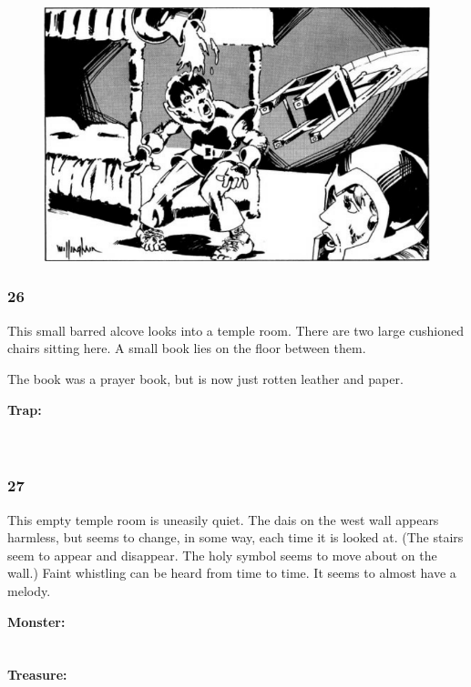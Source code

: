 \documentclass[palace_of_the_silver_princess]{subfiles}
\begin{document}
\begin{figure}[!ht]
    \includegraphics[width=\textwidth]{img/ghost.png}
\end{figure}

\subsubsection{26}
\begin{quotebox}
    This small barred alcove looks into a temple room. There are two
    large cushioned chairs sitting here. A small book lies on the floor
    between them.
\end{quotebox}

The book was a prayer book, but is now just rotten leather and paper.

\textbf{Trap:}
\\
\\
\\

\subsubsection{27}
\begin{quotebox}
    This empty temple room is uneasily quiet. The dais on the west wall
    appears harmless, but seems to change, in some way, each time it is
    looked at. (The stairs seem to appear and disappear. The holy symbol
    seems to move about on the wall.) Faint whistling can be heard from
    time to time. It seems to almost have a melody.
\end{quotebox}

\textbf{Monster:}
\\
\\
\\
\textbf{Treasure:}
\\
\\
\\
\end{document}
